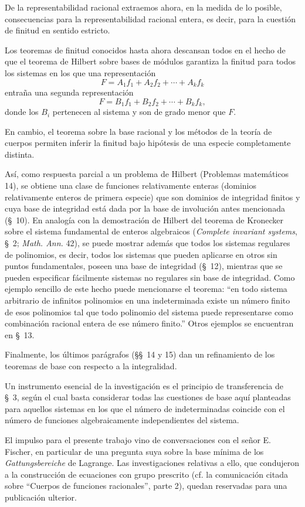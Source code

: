 \documentclass[11pt]{article}
\begin{document}
De la representabilidad racional extraemos ahora, en la medida de lo posible, consecuencias para la representabilidad racional entera, es decir, para la cuestión de finitud en sentido estricto.

Los teoremas de finitud conocidos hasta ahora descansan todos en el hecho de que el teorema de Hilbert sobre bases de módulos garantiza la finitud para todos los sistemas en los que una representación
\[
  F=A_1f_1+A_2f_2+\cdots+A_kf_k
\]
entraña una segunda representación
\[
  F=B_1f_1+B_2f_2+\cdots+B_kf_k,
\]
donde los $B_i$ pertenecen al sistema y son de grado menor que $F$.

En cambio, el teorema sobre la base racional y los métodos de la teoría de cuerpos permiten inferir la finitud bajo hipótesis de una especie completamente distinta.

Así, como respuesta parcial a un problema de Hilbert (Problemas matemáticos 14), se obtiene una clase de funciones relativamente enteras (dominios relativamente enteros de primera especie) que son dominios de integridad finitos y cuya base de integridad está dada por la base de involución antes mencionada (\S\ 10). En analogía con la demostración de Hilbert del teorema de Kronecker sobre el sistema fundamental de enteros algebraicos (\emph{Complete invariant systems}, \S\ 2; \emph{Math. Ann.} 42), se puede mostrar además que todos los sistemas regulares de polinomios, es decir, todos los sistemas que pueden aplicarse en otros sin puntos fundamentales, poseen una base de integridad (\S\ 12), mientras que se pueden especificar fácilmente sistemas no regulares sin base de integridad. Como ejemplo sencillo de este hecho puede mencionarse el teorema: ``en todo sistema arbitrario de infinitos polinomios en una indeterminada existe un número finito de esos polinomios tal que todo polinomio del sistema puede representarse como combinación racional entera de ese número finito.'' Otros ejemplos se encuentran en \S\ 13.

Finalmente, los últimos parágrafos (\S\S\ 14 y 15) dan un refinamiento de los teoremas de base con respecto a la integralidad.

Un instrumento esencial de la investigación es el principio de transferencia de \S\ 3, según el cual basta considerar todas las cuestiones de base aquí planteadas para aquellos sistemas en los que el número de indeterminadas coincide con el número de funciones algebraicamente independientes del sistema.

El impulso para el presente trabajo vino de conversaciones con el señor E. Fischer, en particular de una pregunta suya sobre la base mínima de los \emph{Gattungsbereiche} de Lagrange. Las investigaciones relativas a ello, que condujeron a la construcción de ecuaciones con grupo prescrito (cf. la comunicación citada sobre ``Cuerpos de funciones racionales'', parte 2), quedan reservadas para una publicación ulterior.
\end{document}
